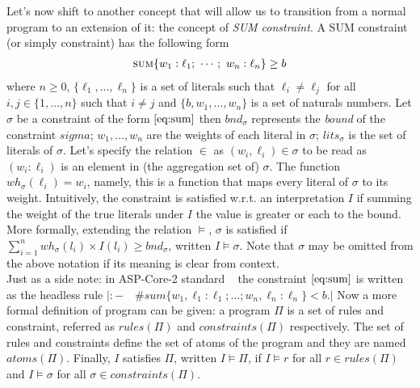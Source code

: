 Let's now shift to another concept that will allow us to 
transition from a normal program to an extension of it: the concept of \textit{SUM constraint}.
A SUM constraint (or simply constraint) has the following form
\begin{align}\label{eq:sum}
    \textsc{sum}\{w_1 : \ell_1;\ \cdots;\ w_n : \ell_n\} \geq b
\end{align}
where $n \ge 0$, $\{\ell_1, \hdots, \ell_n\}$ is a set of literals such that 
$\ell_i \ne \ell_j$ for all $i,j \in \{1, \hdots, n\}$ such that $i \ne j$
and $\{b, w_1, \hdots, w_n \}$ is a set of naturals numbers.
Let $\sigma$  be a constraint of the form $\ref{eq:sum}$ then $\mathit{bnd}_{\sigma}$
represents the \textit{bound} of the constraint $sigma$; $w_1, \hdots, w_n$
are the weights of each literal in $\sigma$; $lits_{\sigma}$ is the set of literals of $\sigma$.
Let's specify the relation $\in$ as $(w_i, \ell_i) \in \sigma$ to be read  
as $(w_i : \ell_i)$ is an element in (the aggregation set of) $\sigma$.
The function $\mathit{wh_{\sigma}}(\ell_i) = w_i$, namely, this is a function that 
maps every literal of $\sigma$ to its weight.
Intuitively, the constraint is satisfied w.r.t. an interpretation $I$ 
if summing the weight of the true literals under $I$ the value is greater
or each to the bound.
More formally, extending the relation $\models$, $\sigma$ is satisfied if 
$\sum_{i=1}^{n} \mathit{wh}_{\sigma}(l_i) \times I(l_i) \ge \mathit{bnd}_{\sigma}$,
written $I \models \sigma$.
Note that $\sigma$ may be omitted from the above notation if its meaning is clear from context.\\
Just as a side note: in ASP-Core-2 standard
~\cite{DBLP:journals/tplp/CalimeriFGIKKLM20} 
the constraint  $\ref{eq:sum}$ is written as the headless rule
$|:- \quad \#sum\{w_1,\ell_1 : \ell_1; ...; w_n,\ell_n : \ell_n\} < b.|$ 
Now a more formal definition of program can be given:
a program $\Pi$ is a set of rules and constraint, referred as $\mathit{rules}(\Pi)$ 
and $\mathit{constraints}(\Pi)$ respectively.
The set of rules and constraints define the set of atoms of the program and they are named $\mathit{atoms}(\Pi)$.
Finally, $I$ satisfies $\Pi$, written $I \models \Pi$, if $I \models r$ for all $r \in \mathit{rules}(\Pi)$
and $I \models \sigma$ for all $\sigma \in \mathit{constraints}(\Pi)$.


